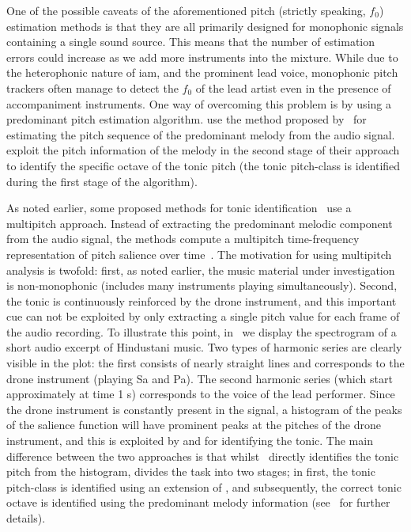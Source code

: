 One of the possible caveats of the aforementioned pitch (strictly speaking, $f_0$) estimation methods is that they are all primarily designed for monophonic signals containing a single sound source. This means that the number of estimation errors could increase as we add more instruments into the mixture. While due to the heterophonic nature of \gls{iam}, and the prominent lead voice, monophonic pitch trackers often manage to detect the $f_0$ of the lead artist even in the presence of accompaniment instruments. One way of overcoming this problem is by using a predominant pitch estimation algorithm. \cite{gulati2012two} use the method proposed by~\cite{Salamon2012} for estimating the pitch sequence of the predominant melody from the audio signal. \cite{gulati2012two} exploit the pitch information of the melody in the second stage of their approach to identify the specific octave of the tonic pitch (the tonic pitch-class is identified during the first stage of the algorithm).

As noted earlier, some proposed methods for tonic identification~\citep{salamon2012multipitch,gulati2012two} use a multipitch approach. Instead of extracting the predominant melodic component from the audio signal, the methods compute a multipitch time-frequency representation of pitch salience over time~\citep{Salamon2011}. The motivation for using multipitch analysis is twofold: first, as noted earlier, the music material under investigation is non-monophonic (includes many instruments playing simultaneously). Second, the tonic is continuously reinforced by the drone instrument, and this important cue can not be exploited by only extracting a single pitch value for each frame of the audio recording. To illustrate this point, in~ we display the spectrogram of a short audio excerpt of Hindustani music. Two types of harmonic series are clearly visible in the plot: the first consists of nearly straight lines and corresponds to the drone instrument (playing Sa and Pa). The second harmonic series (which start approximately at time 1 s) corresponds to the voice of the lead performer. Since the drone instrument is constantly present in the signal, a histogram of the peaks of the salience function will have prominent peaks at the pitches of the drone instrument, and this is exploited by \cite{salamon2012multipitch} and \cite{gulati2012two} for identifying the tonic. The main difference between the two approaches is that whilst~\cite{salamon2012multipitch} directly identifies the tonic pitch from the histogram, \cite{gulati2012two} divides the task into two stages; in first, the tonic pitch-class is identified using an extension of \cite{salamon2012multipitch}, and subsequently, the correct tonic octave is identified using the predominant melody information (see~\cite{Gulati2014Tonic} for further details).

